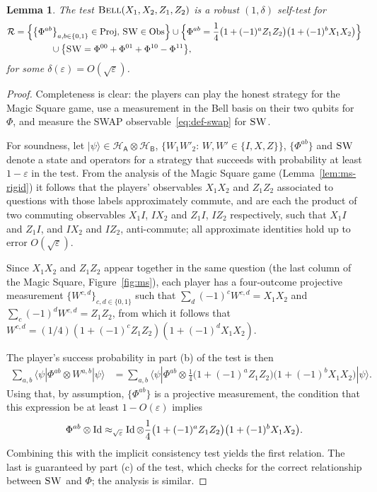 \documentclass[11pt]{article}
\newtheorem{lemma}[theorem]{Lemma}
\theoremstyle{remark}
\theoremstyle{definition}
\newcommand{\ket}[1]{|#1\rangle}
\newcommand{\bra}[1]{\langle#1|}
\newcommand{\Id}{\ensuremath{\mathop{\rm Id}\nolimits}}
\newcommand{\reg}[1]{{\textsf{#1}}}
\newcommand{\mH}{\mathcal{H}}
\newcommand{\setft}[1]{\mathrm{#1}}
\newcommand{\Proj}{\setft{Proj}}
\newcommand{\Obs}{\setft{Obs}}
\newcommand{\eps}{\varepsilon}
\newcommand{\bellt}{\textsc{Bell}}
\newcommand{\SWAP}{\textsc{SW}}
\begin{document}
\begin{lemma}\label{lem:bell-rigid-test}
The test $\bellt(X_1,X_2,Z_1,Z_2)$ is a robust $(1,\delta)$ self-test for 
\begin{align*}
\mathcal{R}&= \Big\{\big\{\Phi^{ab}\big\}_{a,b\in\{0,1\}}\in\Proj,\, \SWAP\in\Obs\Big\}\cup \Big\{\Phi^{ab} = \frac{1}{4}\big(1+(-1)^a Z_1Z_2\big)\big(1+(-1)^bX_1X_2\big) \Big\}\\
&\qquad\qquad \cup \big\{\SWAP = \Phi^{00}+\Phi^{01}+\Phi^{10}-\Phi^{11}\big\},
\end{align*}
 for some $\delta(\eps) = O(\sqrt{\eps})$.
\end{lemma}


\begin{proof}
Completeness is clear: the players can play the honest strategy for the Magic Square game, use a measurement in the Bell basis on their two qubits for $\Phi$, and measure the SWAP observable~\eqref{eq:def-swap} for $\SWAP$. 

For soundness, let $\ket{\psi}\in\mH_\reg{A}\otimes \mH_\reg{B}$, $\{W_1W'_2:\, W,W'\in\{I,X,Z\}\}$, $\{\Phi^{ab}\}$ and $\SWAP$ denote a state and operators for a strategy that succeeds with probability at least $1-\eps$ in the test. From the analysis of the Magic Square game (Lemma~\ref{lem:ms-rigid}) it follows that the players' observables $X_1X_2$ and $Z_1Z_2$ associated to questions with those  labels approximately commute, and are each the product of two commuting observables $X_1I$, $IX_2$ and $Z_1I$, $IZ_2$ respectively, such that $X_1I$ and $Z_1I$, and $IX_2$ and $IZ_2$, anti-commute; all approximate identities hold up to error $O(\sqrt{\eps})$. 

Since $X_1X_2$ and $Z_1Z_2$ appear together in the same question (the last column of the Magic Square, Figure~\ref{fig:ms}), each player has a four-outcome projective measurement $\{W^{c,d}\}_{c,d\in\{0,1\}}$ such that $\sum_d (-1)^c W^{c,d} = X_1X_2$ and $\sum_c (-1)^dW^{c,d} = Z_1Z_2$, from which it follows that $W^{c,d} = (1/4)(1+(-1)^c Z_1Z_2)(1+(-1)^d X_1X_2)$. 

The player's success probability in part (b) of the test is then
\begin{align*}
\sum_{a,b} \bra{\psi} \Phi^{ab} \otimes W^{a,b} \ket{\psi} &= \sum_{a,b} \bra{\psi} \Phi^{ab} \otimes \frac{1}{4} \big(1+(-1)^a Z_1Z_2\big)\big(1+(-1)^bX_1X_2\big) \ket{\psi}.
\end{align*}
Using that, by assumption, $\{\Phi^{ab}\}$ is a projective measurement, the condition that this expression be at least $1-O(\eps)$ implies 
$$\Phi^{ab} \otimes \Id \approx_{\sqrt{\eps}}\Id \otimes \frac{1}{4}\big(1+(-1)^a Z_1Z_2\big)\big(1+(-1)^bX_1X_2\big).$$ 
Combining this with the implicit consistency test yields the first relation. The last is guaranteed by part (c) of the test, which checks for the correct relationship between $\SWAP$ and $\Phi$; the analysis is similar.  
\end{proof}
\end{document}
